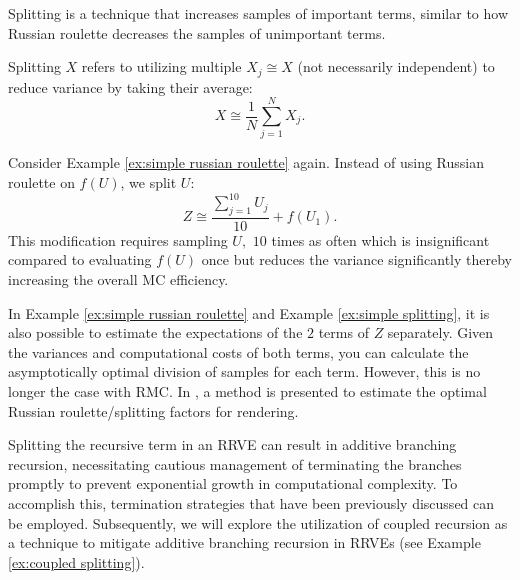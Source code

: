 \documentclass[a4paper,12pt]{article}
\begin{document}
Splitting is a technique that increases samples of important terms, similar to how Russian roulette
decreases the samples of unimportant terms.

\begin{definition}[Splitting] \label{def:splitting}
  Splitting $X$ refers to utilizing multiple $X_{j} \cong X$ (not necessarily independent) to
  reduce variance by taking their average:
  \begin{equation}
    X \cong \frac{1}{N} \sum_{j=1}^{N} X_{j}.
  \end{equation}
\end{definition}

\begin{example} \label{ex:simple splitting}
  Consider Example \ref{ex:simple russian roulette} again.
  Instead of using Russian roulette on $f(U)$, we split $U$:
  \begin{equation}
    Z \cong \frac{\sum_{j=1}^{10} U_j}{10} + f(U_{1}).
  \end{equation}
  This modification requires sampling $U,$
  $10$ times as often which is insignificant compared to evaluating $f(U)$ once
  but reduces the variance significantly thereby increasing the overall MC efficiency.\\
\end{example}

\begin{related}
  In Example \ref{ex:simple russian roulette} and Example \ref{ex:simple splitting},
  it is also possible to estimate the expectations of the $2$ terms
  of $Z$ separately. Given the variances and computational costs
  of both terms, you can calculate the asymptotically optimal division
  of samples for each term. However, this is no longer the case with RMC.
  In \cite{rath_ears_2022}, a method is presented to estimate the optimal
  Russian roulette/splitting factors for rendering.
\end{related}

Splitting the recursive term in an RRVE can result in additive branching recursion,
necessitating cautious management of terminating the branches promptly to prevent
exponential growth in computational complexity. To accomplish this, termination
strategies that have been previously discussed can be employed. Subsequently,
we will explore the utilization of coupled recursion as a technique to mitigate
additive branching recursion in RRVEs (see Example \ref{ex:coupled splitting}).
\end{document}

